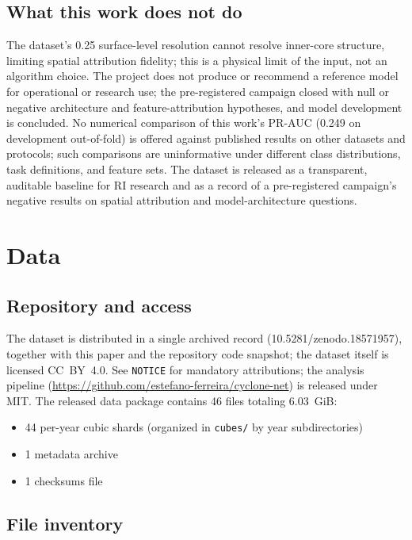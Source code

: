 \documentclass[11pt]{article}
\begin{document}
\subsection{What this work does not do}

The dataset's 0.25\textdegree{} surface-level resolution cannot resolve
inner-core structure, limiting spatial attribution fidelity; this is a
physical limit of the input, not an algorithm choice. The project does not
produce or recommend a reference model for operational or research use; the
pre-registered campaign closed with null or negative architecture and
feature-attribution hypotheses, and model development is concluded. No
numerical comparison of this work's PR-AUC (0.249 on development
out-of-fold) is offered against published results on other datasets and
protocols; such comparisons are uninformative under different class
distributions, task definitions, and feature sets. The dataset is released as
a transparent, auditable baseline for RI research and as a record of a
pre-registered campaign's negative results on spatial attribution and
model-architecture questions.

\section{Data}

\subsection{Repository and access}

The dataset is distributed in a single archived record
(10.5281/zenodo.18571957), together with this paper and the repository
code snapshot; the dataset itself is licensed CC~BY~4.0. See
\texttt{NOTICE} for mandatory attributions; the analysis pipeline
(\url{https://github.com/estefano-ferreira/cyclone-net}) is released under
MIT. The released data package contains 46 files totaling 6.03~GiB:
\begin{itemize}
  \item 44 per-year cubic shards (organized in \texttt{cubes/} by year
  subdirectories)
  \item 1 metadata archive
  \item 1 checksums file
\end{itemize}

\subsection{File inventory}
\end{document}
